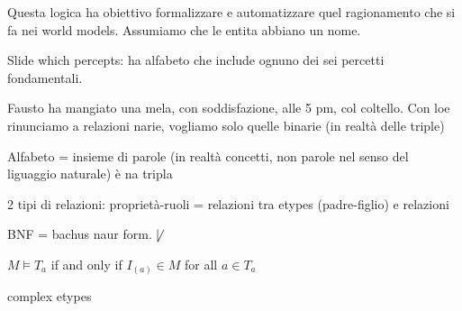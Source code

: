 Questa logica ha obiettivo formalizzare e automatizzare quel ragionamento che si fa nei world models.
Assumiamo che le entita abbiano un nome.

Slide which percepts: ha alfabeto che include ognuno dei sei percetti fondamentali. 

Fausto ha mangiato una mela, con soddisfazione, alle 5 pm, col coltello. Con loe rinunciamo
a relazioni narie, vogliamo solo quelle binarie (in realtà delle triple)


Alfabeto = insieme di parole (in realtà concetti, non parole nel senso del liguaggio naturale)
è na tripla

2 tipi di relazioni: proprietà-ruoli = relazioni tra etypes (padre-figlio) e relazioni

BNF = bachus naur form. $\not\mid$


$M \vDash T_a$ if and only if $I_(a) \in M$ for all $a \in T_a$

complex etypes